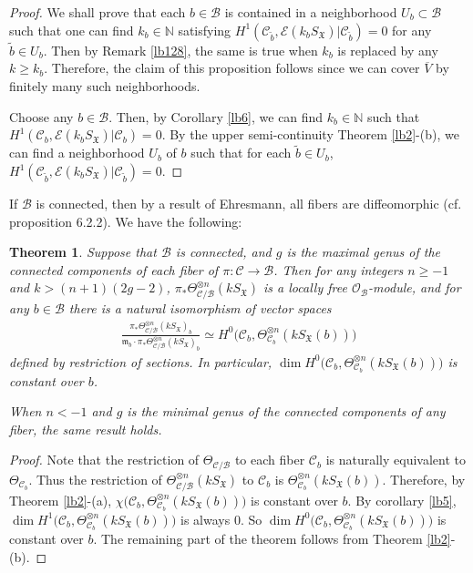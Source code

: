 \documentclass[12pt,a4paper,notitlepage]{report}
\theoremstyle{definition}
\theoremstyle{plain}
\newtheorem{thm}[df]{Theorem}
\newcommand{\fk}{\mathfrak}
\newcommand{\mc}{\mathcal}
\newcommand{\wtd}{\widetilde}
\newcommand{\ovl}{\overline}
\newcommand{\scr}{\mathscr}
\newcommand{\SX}{S_{\fk X}}
\newcommand{\Nbb}{\mathbb N}
\numberwithin{equation}{section}
\begin{document}
\begin{proof}
We shall prove that  each $b\in\mc B$ is contained in a neighborhood $U_b\subset\mc B$ such that one can find $k_b\in\Nbb$ satisfying $H^1(\mc C_{\wtd b},\scr E(k_b\SX)|\mc C_{\wtd b})=0$ for any  $\wtd b\in U_b$. Then by Remark \ref{lb128}, the same is true when $k_b$ is replaced by any $k\geq k_b$.  Therefore, the claim of this proposition follows since we can cover $\ovl V$ by finitely many such neighborhoods.

Choose any $b\in\mc B$. Then, by Corollary \ref{lb6}, we can find $k_b\in\Nbb$ such that $H^1(\mc C_b,\scr E(k_b\SX)|\mc C_b)=0$. By the upper semi-continuity Theorem \ref{lb2}-(b), we can find a neighborhood $U_b$ of $b$ such that for each $\wtd b\in U_b$, $H^1(\mc C_{\wtd b},\scr E(k_b\SX)|\mc C_{\wtd b})=0$.
\end{proof}





If $\mc B$ is connected, then by a result of Ehresmann, all fibers are diffeomorphic (cf. \cite{Huy06} proposition 6.2.2). We have the following:





\begin{thm}\label{lb8}
Suppose that $\mc B$ is connected, and $g$ is the maximal genus of the connected components of each fiber of $\pi:\mc C\rightarrow\mc B$. Then for any integers $n\geq-1$ and $k>(n+1)(2g-2)$, $\pi_*\Theta_{\mc C/\mc B}^{\otimes n}(k\SX)$ is a locally free $\scr O_{\mc B}$-module, and for any $b\in \mc B$ there is a natural isomorphism of vector spaces
\begin{align}
\frac{\pi_*\Theta_{\mc C/\mc B}^{\otimes n}(k\SX)_b}{\fk m_b\cdot\pi_*\Theta_{\mc C/\mc B}^{\otimes n}(k\SX)_b}\simeq H^0\big(\mc C_b,\Theta_{\mc C_b}^{\otimes n}(k\SX(b))\big)\label{eq6}
\end{align} 
defined by restriction of sections. In particular,  $\dim H^0\big(\mc C_b,\Theta_{\mc C_b}^{\otimes n}(k\SX(b))\big)$ is constant over $b$.

When $n<-1$ and $g$ is the minimal genus of the connected components of any fiber, the same result holds.
\end{thm}



\begin{proof}
Note that the restriction of $\Theta_{\mc C/\mc B}$ to each fiber $\mc C_b$ is naturally equivalent to $\Theta_{\mc C_b}$. Thus the restriction of $\Theta_{\mc C/\mc B}^{\otimes n}(k\SX)$ to $\mc C_b$ is $\Theta_{\mc C_b}^{\otimes n}(k\SX(b))$. Therefore, by Theorem \ref{lb2}-(a), $\chi\big(\mc C_b,\Theta_{\mc C_b}^{\otimes n}(k\SX(b))\big)$ is constant over $b$. By corollary  \ref{lb5}, $\dim H^1\big(\mc C_b,\Theta_{\mc C_b}^{\otimes n}(k\SX(b))\big)$ is always $0$. So  $\dim H^0\big(\mc C_b,\Theta_{\mc C_b}^{\otimes n}(k\SX(b))\big)$ is constant over $b$. The remaining part of the theorem follows from Theorem \ref{lb2}-(b).
\end{proof}
\end{document}
